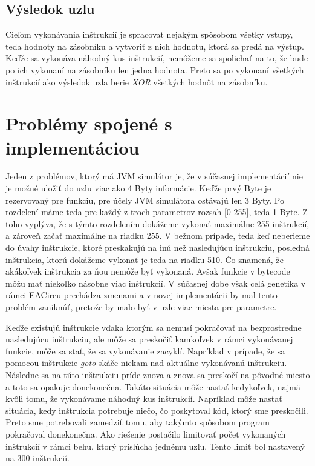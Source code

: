 \subsection{Výsledok uzlu}

Cieľom vykonávania inštrukcií je spracovať nejakým spôsobom všetky vstupy, teda hodnoty na zásobníku a vytvoriť z nich hodnotu, ktorá sa predá na výstup. Keďže sa vykonáva náhodný kus inštrukcií, nemôžeme sa spoliehať na to, že bude po ich vykonaní na zásobníku len jedna hodnota. Preto sa po vykonaní všetkých inštrukcií ako výsledok uzla berie \textit{XOR} všetkých hodnôt na zásobníku. 

\section{Problémy spojené s implementáciou}
\label{sec:problems}

Jeden z problémov, ktorý má JVM simulátor je, že v súčasnej implementácií nie je možné uložiť do uzlu viac ako 4 Byty informácie. Keďže prvý Byte je rezervovaný pre funkciu, pre účely JVM simulátora ostávajú len 3 Byty. Po rozdelení máme teda pre každý z troch parametrov rozsah [0-255], teda 1 Byte. Z toho vyplýva, že s týmto rozdelením dokážeme vykonať maximálne 255 inštrukcií, a zároveň začať maximálne na riadku 255. V bežnom prípade, teda keď neberieme do úvahy inštrukcie, ktoré preskakujú na inú než nasledujúcu inštrukciu, posledná inštrukcia, ktorú dokážeme vykonať je teda na riadku 510. Čo znamená, že akákoľvek inštrukcia za ňou nemôže byť vykonaná. Avšak funkcie v bytecode môžu mať niekoľko násobne viac inštrukcií. V súčasnej dobe však celá genetika v rámci EACircu prechádza zmenami a v novej implementácii by mal tento problém zaniknúť, pretože by malo byť v uzle viac miesta pre parametre.

Keďže existujú inštrukcie vďaka ktorým sa nemusí pokračovať na bezprostredne nasledujúcu inštrukciu, ale môže sa preskočiť kamkoľvek v rámci vykonávanej funkcie, môže sa stať, že sa vykonávanie zacyklí. Napríklad v prípade, že sa pomocou inštrukcie \textit{goto} skáče niekam nad aktuálne vykonávanú inštrukciu. Následne sa na túto inštrukciu príde znova a znova sa preskočí na pôvodné miesto a toto sa opakuje donekonečna. Takáto situácia môže nastať kedykoľvek, najmä kvôli tomu, že vykonávame náhodný kus inštrukcií. Napríklad môže nastať situácia, kedy inštrukcia potrebuje niečo, čo poskytoval kód, ktorý sme preskočili. Preto sme potrebovali zamedziť tomu, aby takýmto spôsobom program pokračoval donekonečna. Ako riešenie postačilo limitovať počet vykonaných inštrukcií v rámci behu, ktorý prislúcha jednému uzlu. Tento limit bol nastavený na 300 inštrukcií.

